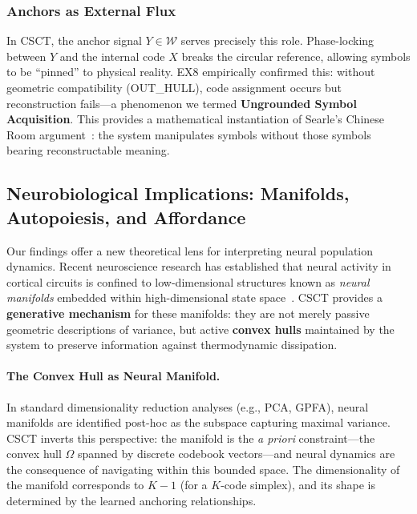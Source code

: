 \documentclass{article}
\begin{document}
\subsubsection{Anchors as External Flux}

In CSCT, the anchor signal $Y \in \mathcal{W}$ serves precisely this role.
Phase-locking between $Y$ and the internal code $X$ breaks the circular reference, allowing symbols to be ``pinned'' to physical reality.
EX8 empirically confirmed this: without geometric compatibility (OUT\_HULL), code assignment occurs but reconstruction fails---a phenomenon we termed \textbf{Ungrounded Symbol Acquisition}.
This provides a mathematical instantiation of Searle's Chinese Room argument~\cite{searle1980minds}: the system manipulates symbols without those symbols bearing reconstructable meaning.


\subsection{Neurobiological Implications: Manifolds, Autopoiesis, and Affordance}

Our findings offer a new theoretical lens for interpreting neural population dynamics.
Recent neuroscience research has established that neural activity in cortical circuits is confined to low-dimensional structures known as \textit{neural manifolds} embedded within high-dimensional state space~\cite{cunningham2014dimensionality, gallego2017neural}.
CSCT provides a \textbf{generative mechanism} for these manifolds: they are not merely passive geometric descriptions of variance, but active \textbf{convex hulls} maintained by the system to preserve information against thermodynamic dissipation.

\paragraph{The Convex Hull as Neural Manifold.}
In standard dimensionality reduction analyses (e.g., PCA, GPFA), neural manifolds are identified post-hoc as the subspace capturing maximal variance.
CSCT inverts this perspective: the manifold is the \emph{a priori} constraint---the convex hull $\Omega$ spanned by discrete codebook vectors---and neural dynamics are the consequence of navigating within this bounded space.
The dimensionality of the manifold corresponds to $K-1$ (for a $K$-code simplex), and its shape is determined by the learned anchoring relationships.
\end{document}
